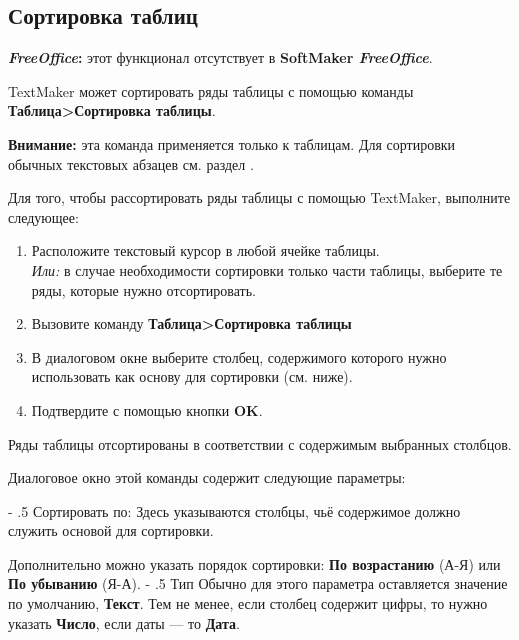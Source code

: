 ﻿\documentclass[a4paper,10pt]{article}
\makeatletter
\renewcommand\paragraph{%
   \@startsection{paragraph}{4}{0mm}%
      {-\baselineskip}%
      {.5\baselineskip}%
      {\normalfont\normalsize\bfseries}}
\makeatother
\begin{document}
\subsection{Сортировка таблиц}
\begin{mdframed}[backgroundcolor=pink!50]
\textbf{\textit{FreeOffice}:} этот функционал отсутствует в \textbf{SoftMaker \textit{FreeOffice}}.
\end{mdframed}
TextMaker может сортировать ряды таблицы с помощью команды \textbf{Таблица>Сортировка таблицы}.

\begin{mdframed}[backgroundcolor=blue!10]
\textbf{Внимание:} эта команда применяется только к таблицам. Для сортировки обычных текстовых абзацев см. раздел .
\end{mdframed}

Для того, чтобы рассортировать ряды таблицы с помощью TextMaker, выполните следующее:
\begin{enumerate}
 \item Расположите текстовый курсор в любой ячейке таблицы.\\
 \textit{Или:} в случае необходимости сортировки только части таблицы, выберите те ряды, которые нужно отсортировать.
 \item Вызовите команду \textbf{Таблица>Сортировка таблицы}
 \item В диалоговом окне выберите столбец, содержимого которого нужно использовать как основу для сортировки (см. ниже).
 \item Подтвердите с помощью кнопки \textbf{OK}.
\end{enumerate}

Ряды таблицы отсортированы в соответствии с содержимым выбранных столбцов.

Диалоговое окно этой команды содержит следующие параметры:

\paragraph{Сортировать по:}
Здесь указываются столбцы, чьё содержимое должно служить основой для сортировки.

Дополнительно можно указать порядок сортировки: \textbf{По возрастанию} (А-Я) или \textbf{По убыванию} (Я-А).
\paragraph{Тип}
Обычно для этого параметра оставляется значение по умолчанию, \textbf{Текст}. Тем не менее, если столбец содержит цифры, то нужно указать \textbf{Число}, если даты — то \textbf{Дата}.
\end{document}
